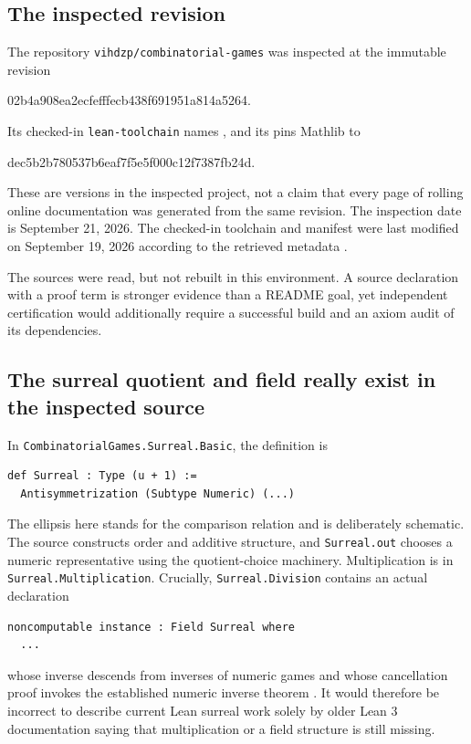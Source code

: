 \documentclass[11pt,letterpaper]{article}
\theoremstyle{definition}
\theoremstyle{remark}
\numberwithin{equation}{section}
\begin{document}
\subsection{The inspected revision}
The repository \texttt{vihdzp/combinatorial-games} was inspected at the immutable revision
\begin{center}\small\ttfamily
02b4a908ea2ecfefffecb438f691951a814a5264.
\end{center}
Its checked-in \texttt{lean-toolchain} names , and its  pins Mathlib to
\begin{center}\small\ttfamily
dec5b2b780537b6eaf7f5e5f000c12f7387fb24d.
\end{center}
These are versions in the inspected project, not a claim that every page of rolling online documentation was generated from the same revision. The inspection date is September 21, 2026. The checked-in toolchain and manifest were last modified on September 19, 2026 according to the retrieved metadata \cite{GamesRepo,GamesToolchain,GamesManifest}.

The sources were read, but not rebuilt in this environment. A source declaration with a proof term is stronger evidence than a README goal, yet independent certification would additionally require a successful build and an axiom audit of its dependencies.

\subsection{The surreal quotient and field really exist in the inspected source}
In \texttt{CombinatorialGames.Surreal.Basic}, the definition is
\begin{lstlisting}
def Surreal : Type (u + 1) :=
  Antisymmetrization (Subtype Numeric) (...)
\end{lstlisting}
The ellipsis here stands for the comparison relation and is deliberately schematic. The source constructs order and additive structure, and \texttt{Surreal.out} chooses a numeric representative using the quotient-choice machinery. Multiplication is in \texttt{Surreal.Multiplication}. Crucially, \texttt{Surreal.Division} contains an actual declaration
\begin{lstlisting}
noncomputable instance : Field Surreal where
  ...
\end{lstlisting}
whose inverse descends from inverses of numeric games and whose cancellation proof invokes the established numeric inverse theorem \cite{GamesBasic,GamesDivision}. It would therefore be incorrect to describe current Lean surreal work solely by older Lean 3 documentation saying that multiplication or a field structure is still missing.
\end{document}
